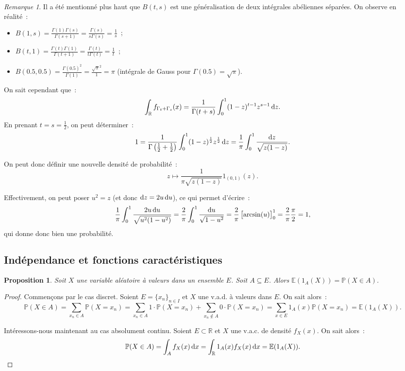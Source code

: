 \documentclass{article}
\newcommand{\E}{\mathbb E}
\renewcommand{\P}{\mathbb P}
\newcommand{\R}{\mathbb R}
\newtheorem{prp}[thm]{Proposition}
\theoremstyle{definition}
\theoremstyle{remark}
\newtheorem*{rmq}{Remarque}
\begin{document}
		\begin{rmq} Il a été mentionné plus haut que $B(t, s)$ est une généralisation de deux intégrales abéliennes séparées. On observe en réalité~:
		\begin{itemize}
			\item $B(1, s) = \frac {\Gamma(1)\Gamma(s)}{\Gamma(s+1)} = \frac {\Gamma(s)}{s\Gamma(s)} = \frac 1s$~;
			\item $B(t, 1) = \frac {\Gamma(t)\Gamma(1)}{\Gamma(t+1)} = \frac {\Gamma(t)}{t\Gamma(t)} = \frac 1t$~;
			\item $B(0.5, 0.5) = \frac {\Gamma(0.5)^2}{\Gamma(1)} = \frac {\sqrt \pi^2}1 = \pi$ (intégrale de Gauss pour $\Gamma(0.5) = \sqrt \pi$).
		\end{itemize}

		On sait cependant que~:
		\[\int_\R f_{\Gamma_t+\Gamma_s}(x) = \frac 1{\Gamma(t+s)}\int_0^1(1-z)^{t-1}z^{s-1}\dif z.\]
		En prenant $t = s = \frac 12$, on peut déterminer~:
		\[1 = \frac 1{\Gamma\left(\frac 12 + \frac 12\right)}\int_0^1(1-z)^{\frac 12}z^{\frac 12}\dif z = \frac 1\pi\int_0^1\frac {\dif z}{\sqrt {z(1-z)}}.\]

		On peut donc définir une nouvelle densité de probabilité~:
		\[z \mapsto \frac {1}{\pi\sqrt{z(1-z)}}1_{(0, 1)}(z).\]

		Effectivement, on peut poser $u^2 = z$ (et donc $\dif z = 2u\dif u$), ce qui permet d'écrire~:
		\[\frac 1\pi\int_0^1\frac {2u\dif u}{\sqrt {u^2(1-u^2)}} = \frac 2\pi\int_0^1\frac {\dif u}{\sqrt {1-u^2}} = \frac 2\pi\left[\arcsin(u)\right]_0^1
		= \frac 2\pi\frac \pi 2 = 1,\]
		qui donne donc bien une probabilité.
		\end{rmq}

	\subsection{Indépendance et fonctions caractéristiques}
		\begin{prp} Soit $X$ une variable aléatoire à valeurs dans un ensemble $E$. Soit $A \subseteq E$. Alors $\E(1_A(X)) = \P(X \in A)$. \end{prp}

		\begin{proof} Commençons par le cas discret. Soient $E = \{x_n\}_{n \in I}$ et $X$ une v.a.d. à valeurs dans $E$. On sait alors~:
		\[\P(X \in A) = \sum_{x_n \in A}\P(X = x_n) = \sum_{x_n \in A}1 \cdot \P(X = x_n) + \sum_{x_n \not \in A}0 \cdot \P(X=x_n)
		= \sum_{x \in E}1_A(x)\P(X=x_n) = \E(1_A(X)).\]

		Intéressons-nous maintenant au cas absolument continu. Soient $E \subset \R$ et $X$ une v.a.c. de densité $f_X(x)$. On sait alors~:
		\[\P(X \in A) = \int_Af_X(x)\dif x = \int_\R 1_A(x)f_X(x)\dif x = \E(1_A(X)).\]
		\end{proof}
\end{document}

